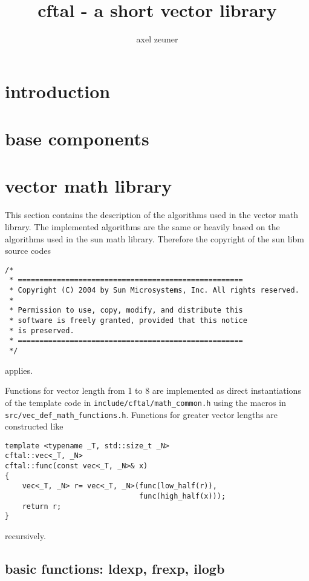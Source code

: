 \documentclass[12pt]{article}
\numberwithin{equation}{subsection}
\begin{document}
\title{cftal - a short vector library}
\author{axel zeuner}
\maketitle

\tableofcontents

\section{introduction}
\label{sec:introduction}

\section{base components}
\label{sec:base}

\section{vector math library}
\label{sec:vec_math_lib}

This section contains the description of the algorithms used in the
vector math library. The implemented algorithms are the same or heavily
based on the algorithms used in the sun math library. Therefore the
copyright of the sun libm source codes
\begin{verbatim}
/*
 * ====================================================
 * Copyright (C) 2004 by Sun Microsystems, Inc. All rights reserved.
 *
 * Permission to use, copy, modify, and distribute this
 * software is freely granted, provided that this notice
 * is preserved.
 * ====================================================
 */
\end{verbatim}
applies.

Functions for vector length from 1 to 8 are implemented as direct
instantiations of the template code in \texttt{include/cftal/math\_common.h}
using the macros in \texttt{src/vec\_def\_math\_functions.h}.
Functions for greater vector lengths are constructed like
\begin{lstlisting}
template <typename _T, std::size_t _N>
cftal::vec<_T, _N>
cftal::func(const vec<_T, _N>& x)
{
    vec<_T, _N> r= vec<_T, _N>(func(low_half(r)),
                               func(high_half(x)));
    return r;
}
\end{lstlisting}
recursively.

\subsection{basic functions: ldexp, frexp, ilogb}
\label{sub_sec:base_math}
\end{document}
